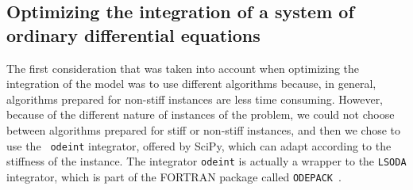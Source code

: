 \subsection{Optimizing the integration of a system of ordinary
differential equations}
The first consideration that was taken into account when optimizing the
integration of the model was to use different algorithms because, in 
general, algorithms prepared for non-stiff instances are less time
consuming. However, because of the different nature of instances of 
the problem, we could not choose between algorithms prepared for stiff 
or non-stiff instances, and then we chose to use the {\tt
odeint} integrator, offered by SciPy, which can adapt according to the
stiffness of the instance. The integrator {\tt odeint} is actually a 
wrapper to the {\tt LSODA} integrator, which is part of the FORTRAN
package called {\tt ODEPACK}~\cite{Hindmarsh1982}.



